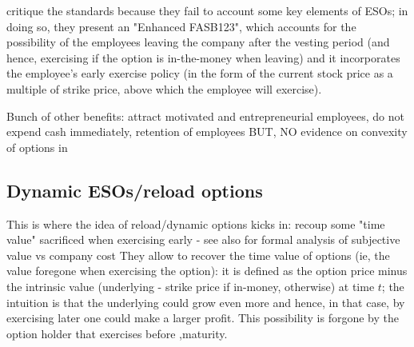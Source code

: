     \cite{hull2004value} critique the \cite{fasb123} standards because they fail to account some key elements of ESOs; in doing so, they present an "Enhanced FASB123", which accounts for the possibility of the employees leaving the company after the vesting period (and hence, exercising if the option is in-the-money when leaving) and it incorporates the employee's early exercise policy (in the form of the current stock price as a multiple of strike price, above which the employee will exercise).



    Bunch of other benefits: attract motivated and entrepreneurial employees, do not expend cash immediately, retention of employees  \cite{hall2003trouble}
    BUT, NO evidence on convexity of options in \cite{hayes2012stock}

\subsection{Dynamic ESOs/reload options} %
    This is where the idea of reload/dynamic options kicks in: recoup some "time value" sacrificed when exercising early - see also \cite{hall2002stock} for formal analysis of subjective value vs company cost
    They allow to recover the time value of options (ie, the value foregone when exercising the option): it is defined as the option price minus the intrinsic value (underlying - strike price if in-money, otherwise) at time $t$; the intuition is that the underlying could grow even more and hence, in that case, by exercising later one could make a larger profit. This possibility is forgone by the option holder that exercises before ,maturity.

